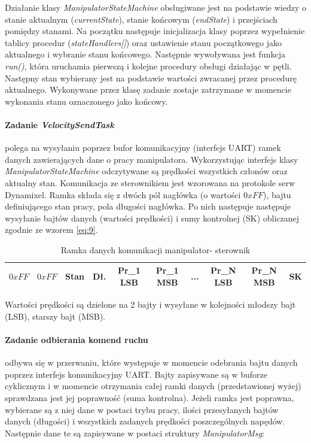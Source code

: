 \documentclass[a4paper, 12pt, twoside]{article}
\begin{document}
Działanie klasy \textit{ManipulatorStateMachine} obsługiwane jest na podstawie wiedzy o stanie aktualnym (\textit{currentState}), stanie końcowym (\textit{endState}) i przejściach pomiędzy stanami. Na początku następuje inicjalizacja klasy poprzez wypełnienie tablicy procedur (\textit{stateHandlers[]}) oraz ustawienie stanu początkowego jako aktualnego i wybranie stanu końcowego. Następnie wywoływana jest funkcja \textit{run()}, która uruchamia pierwszą i kolejne procedury obsługi działając w pętli. Następny stan wybierany jest na podstawie wartości zwracanej przez procedurę aktualnego. Wykonywane przez klasę zadanie zostaje zatrzymane w momencie wykonania stanu oznaczonego jako końcowy.

\newpage
\paragraph{Zadanie \textit{VelocitySendTask}} polega na wysyłaniu poprzez bufor komunikacyjny (interfejs UART) ramek danych zawierających dane o pracy manipulatora. Wykorzystując interfejs klasy \textit{ManipulatorStateMachine} odczytywane są prędkości wszystkich członów oraz aktualny stan. Komunikacja ze sterownikiem jest wzorowana na protokole serw Dynamixel. Ramka składa się z dwóch pól nagłówka (o wartości $0xFF$), bajtu definiującego stan pracy, pola długości nagłówka. Po nich następuje następuje wysyłanie bajtów danych (wartości prędkości) i sumy kontrolnej (SK) obliczanej zgodnie ze wzorem \ref{eq:9}. 

\begin{table}[htb!]
\label{comm}
\begin{center}
\caption{Ramka danych komunikacji manipulator- sterownik }
\begin{tabular}{ | c | c | c | c | c | c | c | c | c | c | }
\hline
 $0xFF$ & $0xFF$ & Stan & Dł. & Pr\_1 LSB & Pr\_1 MSB & ... & Pr\_N LSB & Pr\_N MSB & SK \\ 
\hline
\end{tabular}
\end{center}
\end{table}

Wartości prędkości są dzielone na 2 bajty i wysyłane w kolejności młodszy bajt (LSB), starszy bajt (MSB).

\paragraph{Zadanie odbierania komend ruchu} odbywa się w przerwaniu, które występuje w momencie odebrania bajtu danych poprzez interfejs komunikacyjny UART. Bajty zapisywane są w buforze cyklicznym i w momencie otrzymania całej ramki danych (przedstawionej wyżej) sprawdzana jest jej poprawność (suma kontrolna). Jeżeli ramka jest poprawna, wybierane są z niej dane w postaci trybu pracy, ilości przesyłanych bajtów danych (długości) i wszystkich zadanych prędkości poszczególnych napędów. Następnie dane te są zapisywane w postaci struktury \textit{ManipulatorMsg}:
\end{document}
